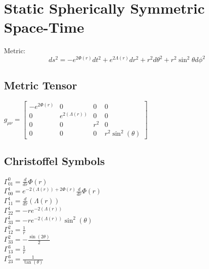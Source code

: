 \documentclass{article}
\begin{document}
\section*{Static Spherically Symmetric Space-Time}
Metric:
\[
ds^2=-e^{2\Phi(r)}dt^2+e^{2\Lambda(r)}dr^2+r^2d\theta^2+r^2\sin^2\theta d\phi^2
\]
\subsection*{Metric Tensor}
$g_{\mu\nu}=\left[\begin{matrix}- e^{2 \Phi{\left(r \right)}} & 0 & 0 & 0\\0 & e^{2 \left(\Lambda{\left(r \right)}\right)} & 0 & 0\\0 & 0 & r^{2} & 0\\0 & 0 & 0 & r^{2} \sin^{2}{\left(\theta \right)}\end{matrix}\right]$

\subsection*{Christoffel Symbols}
$\Gamma^0_{01}=\frac{d}{d r} \Phi{\left(r \right)}$\\
$\Gamma^1_{00}=e^{- 2 \left(\Lambda{\left(r \right)}\right) + 2 \Phi{\left(r \right)}} \frac{d}{d r} \Phi{\left(r \right)}$\\
$\Gamma^1_{11}=\frac{d}{d r} \left(\Lambda{\left(r \right)}\right)$\\
$\Gamma^1_{22}=- r e^{- 2 \left(\Lambda{\left(r \right)}\right)}$\\
$\Gamma^1_{33}=- r e^{- 2 \left(\Lambda{\left(r \right)}\right)} \sin^{2}{\left(\theta \right)}$\\
$\Gamma^2_{12}=\frac{1}{r}$\\
$\Gamma^2_{33}=- \frac{\sin{\left(2 \theta \right)}}{2}$\\
$\Gamma^3_{13}=\frac{1}{r}$\\
$\Gamma^3_{23}=\frac{1}{\tan{\left(\theta \right)}}$\\
\end{document}
